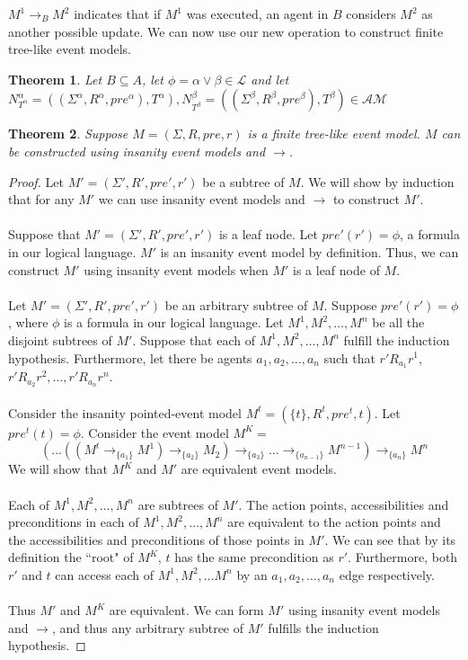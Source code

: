 \documentclass[12pt, a4paper, titlepage]{scrartcl}
\newtheorem{thm}{Theorem}
\begin{document}
$M^1 \to_B M^2$ indicates that if $M^1$ was executed, an agent in $B$ considers $M^2$ as another
possible update.
We can now use our new operation to construct finite tree-like event models.


\begin{thm}
Let $B \subseteq A$, let $\phi = \alpha \lor \beta \in \mathcal{L}$ and let
$N^{\alpha}_{T^\alpha} = ((\Sigma^\alpha, R^\alpha, pre^\alpha), T^\alpha),
  N^\beta_{T^\beta} = ((\Sigma^\beta, R^\beta, pre^\beta), T^\beta) \in
  \mathcal{AM}$
\end{thm}

\begin{thm}
Suppose $M = (\Sigma, R, pre, r)$ is a finite tree-like event model.
$M$ can be constructed using insanity event models and $\to$.
\end{thm}
\begin{proof}
Let $M' = (\Sigma', R', pre', r')$ be a subtree of $M$.
We will show by induction that for any $M'$ we can use insanity event models and $\to$ to
construct $M'$.\\
\\
Suppose that $M' = (\Sigma', R', pre', r')$ is a leaf node.
Let $pre'(r') = \phi$, a formula in our logical language.
$M'$ is an insanity event model by definition.
Thus, we can construct $M'$ using insanity event models when $M'$ is a leaf node of $M$.\\
\\
Let $M' = (\Sigma', R', pre', r')$ be an arbitrary subtree of $M$.
Suppose $pre'(r') = \phi$, where $\phi$ is a formula in our logical language.
Let $M^1, M^2, \ldots, M^n$ be all the disjoint subtrees of $M'$.
Suppose that each of $M^1, M^2, \ldots, M^n$ fulfill the induction hypothesis.
Furthermore, let there be agents $a_1, a_2, \ldots, a_n$ such that $r' R_{a_1} r^1$, $r' R_{a_2} r^2,
	\ldots, r' R_{a_n} r^n$.\\
\\
Consider the insanity pointed-event model $M^t = (\{ t \}, R^t, pre^t, t)$.
Let $pre^t(t) = \phi$.
Consider the event model $M^K = $
\[
(\ldots((M^t \to_{\{a_1\}} M ^ 1) \to_{\{a_2\}} M_2) \to_{\{a_3\}} \ldots
\to_{\{a_{n-1}\}} M^{n-1} ) \to_{\{a_n\}} M ^ n
\]
We will show that $M^K$ and $M'$ are equivalent event models.\\
\\
Each of $M^1, M^2, \ldots, M^n$ are subtrees of $M'$.
The action points, accessibilities and preconditions in each of $M^1, M^2, \ldots, M^n$ are
equivalent to the action points and the accessibilities and preconditions of those points in $M'$.
We can see that by its definition the ``root" of $M^K$, $t$ has the same precondition as $r'$.
Furthermore, both $r'$ and $t$ can access each of $M^1, M^2, \ldots M^n$ by an $a_1, a_2, \ldots, a_n$ edge
respectively.\\
\\
Thus $M'$ and $M^K$ are equivalent.
We can form $M'$ using insanity event models and $\to$, and thus any arbitrary subtree of $M'$
fulfills the induction hypothesis.
\end{proof}
\end{document}
